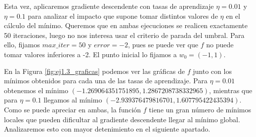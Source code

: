 \documentclass[10pt,a4paper]{article}
\begin{document}
Esta vez, aplicaremos gradiente descendente con tasas de aprendizaje $\eta = 0.01$ y $\eta = 0.1$ para analizar el impacto que supone tomar distintos valores de $\eta$ en el cálculo del mínimo. Queremos que en ambas ejecuciones se realicen exactamente 50 iteraciones, luego no nos interesa usar el criterio de parada del umbral. Para ello, fijamos $max\_iter = 50$ y $error = -2$, pues se puede ver que $f$ no puede tomar valores inferiores a -2. El punto inicial lo fijamos a $w_0 = (-1, 1)$.

En la Figura \ref{fig:ej1.3_graficas} podemos ver las gráficas de $f$ junto con los mínimos obtenidos para cada una de las tasas de aprendizaje. Para $\eta = 0.01$ obtenemos el mínimo $(-1.269064351751895, 1.2867208738332965)$, mientras que para $\eta = 0.1$ llegamos al mínimo $(-2.939376479816701, 1.607795422435394)$. Como se puede apreciar en ambas, la función $f$ tiene un gran número de mínimos locales que pueden dificultar al gradiente descendente llegar al mínimo global. Analizaremos esto con mayor detenimiento en el siguiente apartado.
\end{document}
